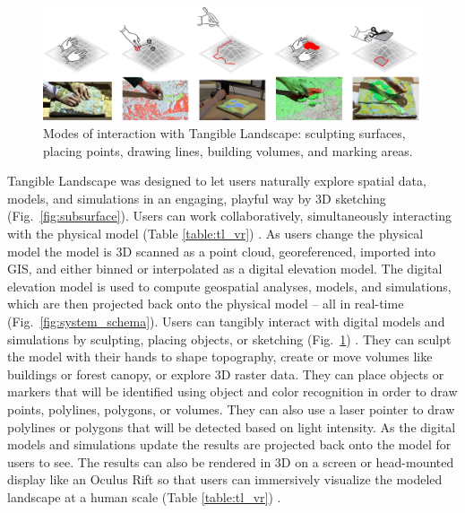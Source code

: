 \documentclass[prodmode,acmtochi]{acmsmall} %
\begin{document}
\begin{figure}
\begin{center}
		\includegraphics[width=\textwidth]{images/interactions.png}
	\caption{Modes of interaction with Tangible Landscape: sculpting surfaces, placing points, drawing lines, building volumes, and marking areas.}
	\label{fig:interactions}
\end{center}
\end{figure}

Tangible Landscape was designed to let users naturally explore 
spatial data, models, and simulations in an engaging, playful way
by 3D sketching (Fig.~\ref{fig:subsurface}). 
Users can work collaboratively, 
simultaneously interacting with the physical model
(Table \ref{table:tl_vr}) \cite{Tabrizian2016}. 
As users change the physical model
the model is 3D scanned as a point cloud, georeferenced, imported into GIS, 
and either binned or interpolated as a digital elevation model. 
The digital elevation model is used to compute 
geospatial analyses, models, and simulations, 
which are then projected back onto the physical model 
-- all in real-time (Fig.~\ref{fig:system_schema}). 
Users can tangibly interact with digital models and simulations
by sculpting, placing objects, or sketching (Fig.~\ref{fig:interactions}) .
They can sculpt the model with their hands
to shape topography, 
create or move volumes
like buildings or forest canopy, 
or explore 3D raster data.  
They can place objects or markers 
that will be identified using object and color recognition
in order to draw points, polylines, polygons, or volumes. 
They can also use a laser pointer to draw polylines or polygons
that will be detected based on light intensity. 
As the digital models and simulations update
the results are projected back onto the model for users to see. 
The results can also be rendered in 3D 
on a screen or head-mounted display like an Oculus Rift
so that users can immersively visualize the modeled landscape 
at a human scale 
(Table \ref{table:tl_vr}) \cite{Tabrizian2016}.
\end{document}
